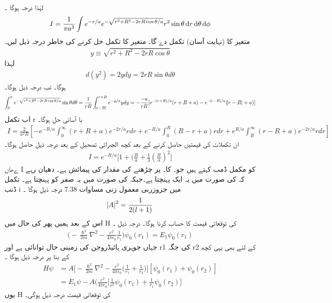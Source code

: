 %
لہٰذا درجہ ہوگا ۔
\begin{align}
I=\frac{1}{\pi a^{3}}\int e^{-r/a}e^{-\sqrt{r^{2}+R^{2}-2rR\cos{\theta/a}}}r^{2}\sin{\theta}\dif r\dif \theta \dif \phi
\end{align}
 متغیر    کا (نہایت آسان) تکمل     دے گا۔ متغیر      کا تکمل حل کرنے کی خاطر درجہ ذیل لیں۔
\begin{align}
y\equiv\sqrt{r^{2}+R^{2}-2rR\cos{\theta}} 
\end{align}
 لہٰذا 
\begin{align}
d(y^{2})=2ydy=2rR\sin{\theta}d\theta
\end{align}
 ہوگا۔ تب درجہ ذیل ہوگا۔
\begin{align}
\int_{0}^{\pi}e^{-\sqrt{r^{2}+R^{2}-2rR\cos{\theta/a}}}\sin{\theta}d\theta=\frac{1}{rR}\int_{\abs{r-R}}^{r+R}e^{-y/a}ydy=-\frac{-a}{rR}[e^{-(r+R)/a}(r+R+a)-e^{-\abs{r-R}/a}(\abs{r-R}+a)]
\end{align}
 اب تکمل r با آسانی حل ہوگا۔ 
\begin{align}
I=\frac{2}{a^{2}R}[-e^{-R/a}\int_{0}^{\infty}(r+R+a)e^{-2r/a}rdr+e^{-R/a}\int_{0}^{R}(R-r+a)rdr+e^{R/a}\int_{R}^{\infty}(r-R+a)e^{-2r/a}rdr]
\end{align}
 ان تکملات کی قیمتیں حاصل کرنے کے بعد کچھ الجبرائی تصحیل کے بعد درجہ ذیل حاصل ہوگا۔
\begin{align}
I=e^{-R/a}\big[1+(\frac{R}{a}+\frac{1}{3}(\frac{R}{a})^{2}\big]
\end{align}
 ےھاں  ٰI کو مکمل ڈمب کہتے ہیں جو۔   کا۔    پر چڑھنے کی مقدار کی پیمائش ہے۔ دھیان رہے کہ     کی صورت میں یہ ایک پہنچتا ہے۔جبکہ      کی صورت میں یہ صفر کو پہنچتا ہے۔ تکمل ڈنب i میں جزوزربی معمول زنی مساوات 7.38 درجہ ذیل ہوگا ۔
\begin{align}
\abs{A}^{2}=\frac{1}{2(l+1)} 
\end{align}
 اس کے بعد ہمیں پھر کی حال    میں H کی توقعاتی قیمت کا حساب کرنا ہوگا۔ درجہ ذیل ۔
 \begin{align}
\big(-\frac{\hslash^{2}}{2m}\nabla^{2}-\frac{e^{2}}{4\pi\epsilon_{0}}\frac{1}{e_{1}}\big)\psi_{0}(r_{1})=E_{1}\psi_{0}(r_{1})
\end{align}
  جہاں     جوہری ہائیڈروجن کی زمینی حال توانائی ہے اور r1 کی جگہ r2 کے لئے بھی یہی کچھ کے بنا پر درجہ ذیل ہوگا ۔
\begin{align*} H\psi&=A\big[-\frac{\hslash^{2}}{2m}\nabla^{2}-\frac{e^{2}}{4\pi\epsilon_{0}}\big(\frac{1}{r_{1}}+\frac{1}{r_{2}}\big)\big][\psi_{0}(r_{1})+\psi_{0}(r_{2})]\\
&=E_{1}\psi-A(\frac{e^{2}}{4\pi\epsilon_{0}}\big[\frac{1}{r^{2}}\psi_{0}(r_{1})+\frac{1}{r_{1}}\psi_{0}(r_{2})\big]
\end{align*} یوں H کی توقعاتی قیمت درجہ ذیل ہوگی۔
